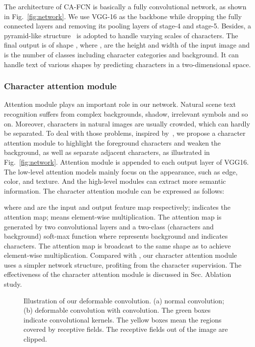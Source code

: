 \documentclass[letterpaper]{article} \usepackage{aaai19}  \usepackage{times}  \usepackage{helvet}  \usepackage{courier}  \usepackage{url}  \usepackage{graphicx}  \frenchspacing  \usepackage{multirow}
\begin{document}
The architecture of CA-FCN is basically a fully convolutional network, as shown in Fig.~\ref{fig:network}. We use VGG-16 as the backbone while dropping the fully connected layers and removing its pooling layers of stage-4 and stage-5. Besides, a pyramid-like structure~\cite{fpn} is adopted to handle varying scales of characters. The final output is of shape , where ,  are the height and width of the input image and  is the number of classes including character categories and background. It can handle text of various shapes by predicting characters in a two-dimensional space.

\subsubsection{Character attention module}
Attention module plays an important role in our network. Natural scene text recognition suffers from complex backgrounds, shadow, irrelevant symbols and so on. Moreover, characters in natural images are usually crowded, which can hardly be separated. To deal with those problems, inspired by~\cite{res-attention}, we propose a character attention module to highlight the foreground characters and weaken the background, as well as separate adjacent characters, as illustrated in Fig.~\ref{fig:network}. Attention module is appended to each output layer of VGG16. The low-level attention models mainly focus on the appearance, such as edge, color, and texture. And the high-level modules can extract more semantic information. The character attention module can be expressed as follows:

where  and  are the input and output feature map respectively;  indicates the attention map;  means element-wise multiplication. The attention map is generated by two convolutional layers and a two-class (characters and background) soft-max function where  represents background and  indicates characters. The attention map  is broadcast to the same shape as  to achieve element-wise multiplication. 
Compared with \cite{res-attention}, our character attention module uses a simpler network structure, profiting from the character supervision.
The effectiveness of the character attention module is discussed in Sec. Ablation study.

\begin{figure}[!htp]
\begin{center}
\captionsetup[subfigure]{justification=centering}
    \centering
{}
\end{center}
\caption{Illustration of our deformable convolution. (a) normal convolution; (b) deformable convolution with  convolution. The green boxes indicate convolutional kernels. The yellow boxes mean the regions covered by receptive fields. The receptive fields out of the image are clipped.}
\label{fig:deform}
\end{figure}
\end{document}
